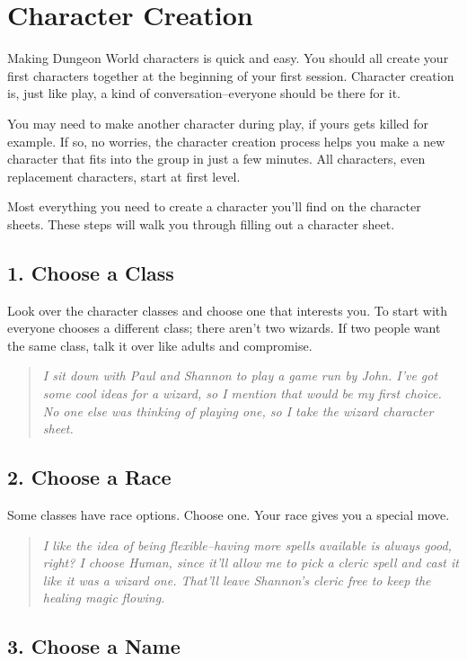 \chapter{Character Creation}

Making Dungeon World characters is quick and easy. You should all create your first characters together at the beginning of your first session. Character creation is, just like play, a kind of conversation--everyone should be there for it.

You may need to make another character during play, if yours gets killed for example. If so, no worries, the character creation process helps you make a new character that fits into the group in just a few minutes. All characters, even replacement characters, start at first level.

Most everything you need to create a character you'll find on the character sheets. These steps will walk you through filling out a character sheet.
\section*{1. Choose a Class}

Look over the character classes and choose one that interests you. To start with everyone chooses a different class; there aren't two wizards. If two people want the same class, talk it over like adults and compromise.

\begin{quote}
\emph{I sit down with Paul and Shannon to play a game run by John. I've got some cool ideas for a wizard, so I mention that would be my first choice. No one else was thinking of playing one, so I take the wizard character sheet.}
\end{quote}
\section*{2. Choose a Race}

Some classes have race options. Choose one. Your race gives you a special move.

\begin{quote}
\emph{I like the idea of being flexible--having more spells available is always good, right? I choose Human, since it'll allow me to pick a cleric spell and cast it like it was a wizard one. That'll leave Shannon's cleric free to keep the healing magic flowing.}
\end{quote}
\section*{3. Choose a Name}

